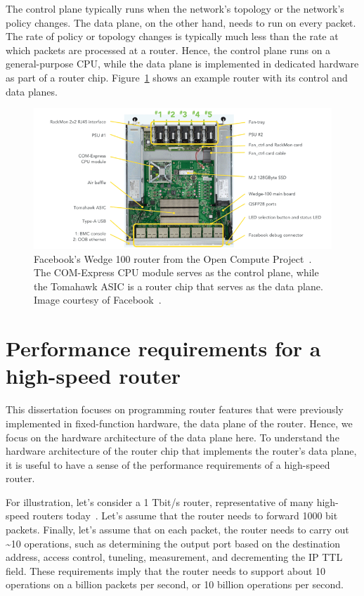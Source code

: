 The control plane typically runs when the network's topology or the network's
policy changes. The data plane, on the other hand, needs to run on every
packet. The rate of policy or topology changes is typically much less than the
rate at which packets are processed at a router. Hence, the control plane runs
on a general-purpose CPU, while the data plane is implemented in dedicated
hardware as part of a router chip.  Figure~\ref{fig:router_box} shows
an example router with its control and data planes.

\begin{figure}
\centering
\includegraphics[width=\textwidth]{wedge100.png}
\caption{Facebook's Wedge 100 router from the Open Compute Project~\cite{ocp}.
The COM-Express CPU module serves as the control plane, while the Tomahawk ASIC
is a router chip that serves as the data plane. Image courtesy of
Facebook~\cite{wedge100}.}
\label{fig:router_box}
\end{figure}

\section{Performance requirements for a high-speed router}
This dissertation focuses on programming router features that were previously
implemented in fixed-function hardware, \ie the data plane of the router.
Hence, we focus on the hardware architecture of the data plane here.  To
understand the hardware architecture of the router chip that implements the
router's data plane, it is useful to have a sense of the performance
requirements of a high-speed router.

For illustration, let's consider a 1 Tbit/s router, representative of many
high-speed routers today~\cite{trident2, tomahawk, tomahawk2}. Let's assume
that the router needs to forward 1000 bit packets. Finally, let's assume that
on each packet, the router needs to carry out \textasciitilde10 operations,
such as determining the output port based on the destination address, access
control, tuneling, measurement, and decrementing the IP TTL field. These
requirements imply that the router needs to support about 10 operations on a
billion packets per second, or 10 billion operations per second.

